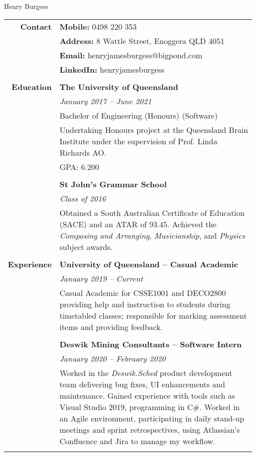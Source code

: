 \documentclass[a4paper]{article}
\begin{document}
\begin{center}
	\Huge{Henry Burgess}
\end{center}

\begin{longtable}{r p{13.5cm}} 
	\textbf{Contact} 			\vline &	 \textbf{Mobile:}  0498 220 353 \\ 
										\vline &	\textbf{Address:} 8 Wattle Street, Enoggera QLD 4051 \\
										\vline &	\textbf{Email:} henryjamesburgess@bigpond.com \\
										\vline &	\textbf{LinkedIn:} henryjamesburgess \\
										& \\
										
	\textbf{Education} 		\vline & \textbf{The University of Queensland} \\
										\vline & \textit{January 2017 – June 2021} \\
										\vline & Bachelor of Engineering (Honours) (Software) \\
										\vline & Undertaking Honours project at the Queensland Brain Institute under the supervision of Prof. Linda Richards AO. \\
										\vline & GPA: 6.200 \\
										\vline & \\
										
										\vline & \textbf{St John’s Grammar School} \\
										\vline & \textit{Class of 2016} \\
										\vline & Obtained a South Australian Certificate of Education (SACE) and an ATAR of 93.45. Achieved the \textit{Composing and Arranging}, \textit{Musicianship}, and \textit{Physics} subject awards. \\
										& \\
										
	\textbf{Experience} 		\vline & \textbf{University of Queensland – Casual Academic} \\
										\vline & \textit{January 2019 – Current} \\
										\vline & Casual Academic for CSSE1001 and DECO2800 providing help and instruction to students during timetabled classes; responsible for marking assessment items and providing feedback. \\ 
										\vline & \\
										
										\vline & \textbf{Deswik Mining Consultants – Software Intern} \\
										\vline & \textit{January 2020 – February 2020} \\
										\vline & Worked in the \textit{Deswik.Sched} product development team delivering bug fixes, UI enhancements and maintenance. Gained experience with tools such as Visual Studio 2019, programming in C\#. Worked in an Agile environment, participating in daily stand-up meetings and sprint retrospectives, using Atlassian’s Confluence and Jira to manage my workflow. \\ 
										\vline & \\
										

\end{longtable}
\end{document}
